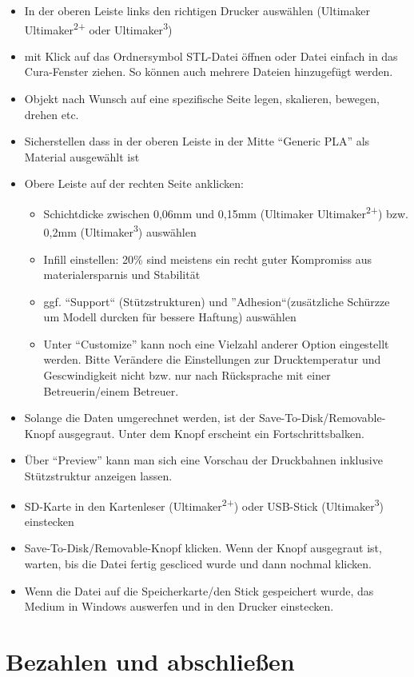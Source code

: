 \documentclass{\basedir/fablab-document}
\newcommand{\ts}[1]{\textsuperscript{#1}}
\begin{document}
\begin{itemize}
\item In der oberen Leiste links den richtigen Drucker auswählen (Ultimaker Ultimaker\ts{2+} oder Ultimaker\ts3)
\item mit Klick auf das Ordnersymbol STL-Datei öffnen oder Datei einfach in das Cura-Fenster ziehen. So können auch mehrere Dateien hinzugefügt werden.
\item Objekt nach Wunsch auf eine spezifische Seite legen, skalieren, bewegen, drehen etc.
\item Sicherstellen dass in der oberen Leiste in der Mitte \enquote{Generic PLA} als Material ausgewählt ist
\item Obere Leiste auf der rechten Seite anklicken:
  \begin{itemize}
    \item Schichtdicke zwischen 0,06mm und 0,15mm (Ultimaker Ultimaker\ts{2+}) bzw. 0,2mm (Ultimaker\ts3) auswählen
    \item Infill einstellen: 20\% sind meistens ein recht guter Kompromiss aus materialersparnis und Stabilität
    \item ggf. ``Support`` (Stützstrukturen) und ''Adhesion``(zusätzliche Schürzze um Modell durcken für bessere Haftung) auswählen
    \item Unter \enquote{Customize} kann noch eine Vielzahl anderer Option eingestellt werden. Bitte Verändere die Einstellungen zur Drucktemperatur und Gescwindigkeit nicht bzw. nur nach Rücksprache mit einer Betreuerin/einem Betreuer.
  \end{itemize}
\item Solange die Daten umgerechnet werden, ist der Save-To-Disk/Removable-Knopf ausgegraut. Unter dem Knopf erscheint ein Fortschrittsbalken.
\item Über \enquote{Preview} kann man sich eine Vorschau der Druckbahnen inklusive Stützstruktur anzeigen lassen.
\item SD-Karte in den Kartenleser (Ultimaker\ts{2+}) oder USB-Stick (Ultimaker\ts3) einstecken
\item Save-To-Disk/Removable-Knopf klicken. Wenn der Knopf ausgegraut ist, warten, bis die Datei fertig gescliced wurde und dann nochmal klicken.
\item Wenn die Datei auf die Speicherkarte/den Stick gespeichert wurde, das Medium in Windows auswerfen und in den Drucker einstecken.
\end{itemize}

\section{Bezahlen und abschließen}
\end{document}
